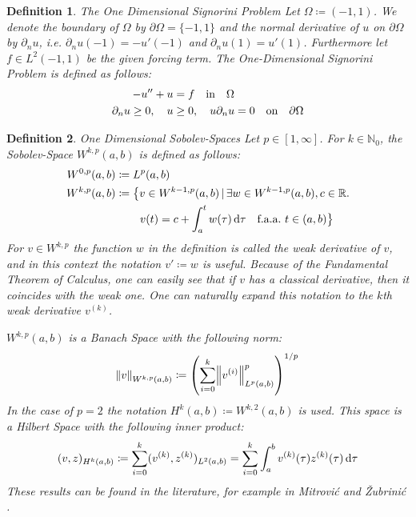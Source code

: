 \documentclass[headsepline,footsepline,footinclude=false,oneside,fontsize=11pt,paper=a4,listof=totoc,bibliography=totoc]{scrbook} %
\newtheorem{definition}{Definition}
\begin{document}
\begin{definition}The One Dimensional Signorini Problem \newline
	Let $\Omega \coloneqq (-1,1)$. We denote the boundary of $\Omega$ by $\partial\Omega = \{-1,1\}$ and the normal derivative of $u$ on $\partial\Omega$ by $\partial_nu$, i.e. $\partial_nu(-1) = -u'(-1)$ and $\partial_nu(1) = u'(1)$. Furthermore let $f \in L^2(-1,1)$ be the given forcing term. The One-Dimensional Signorini Problem is defined as follows:
	\begin{align}
	-u'' + u &= f \quad \textnormal{in} \quad \Omega \label{eq:signorini}\\ 
	\partial_n u \geq 0,\quad u &\geq 0,\quad u\partial_nu = 0 \quad\textnormal{on}\quad \partial \Omega \label{eq:boundary_signorini}
	\end{align}
\end{definition}

\begin{definition}One Dimensional Sobolev-Spaces \newline
	Let $p\in [1,\infty]$. For $k \in \mathbb{N}_0$, the Sobolev-Space $W^{k,p}(a,b)$ is defined as follows:
	\begin{align}
	\begin{split}
	W^{0,p}(a,b) &\coloneqq L^p(a,b) \\
	W^{k,p}(a,b) &\coloneqq \big\{ v \in W^{k-1,p}(a,b) \,|\, \exists w \in W^{k-1,p}(a,b), c\in\mathbb{R}. \\
	& \phantom{\coloneqq \big\{\,\,} v(t) =  c + \int_a^t w(\tau) \dif \tau \quad \text{f.a.a.} \,\, t\in (a,b)  \big\}
	\end{split}
	\end{align}
	For $v\in W^{k,p}$ the function $w$ in the definition is called the weak derivative of $v$, and in this context the notation $v' \coloneqq w$ is useful. Because of the Fundamental Theorem of Calculus, one can easily see that if $v$ has a classical derivative, then it coincides with the weak one. One can naturally expand this notation to the $k$th weak derivative $v^{(k)}$.
	
	$W^{k,p}(a,b)$ is a Banach Space with the following norm:
	\begin{equation}
	\norm{v}_{W^{k,p}(a,b)} \coloneqq \left(\sum\limits_{i = 0}^k \norm{v^{(i)}}_{L^p(a,b)}^p\right)^{1/p} \label{eq:sobolev1_norm}
	\end{equation}
	In the case of $p=2$ the notation $H^k(a,b) \coloneqq W^{k,2}(a,b)$ is used. This space is a Hilbert Space with the following inner product:
	\begin{equation}
	(v,z)_{H^k(a,b)} \coloneqq \sum_{i=0}^{k} (v^{(k)}, z^{(k)})_{L^2(a,b)} = \sum_{i=0}^{k} \int_a^b v^{(k)}(\tau)z^{(k)}(\tau) \dif \tau \label{eq:sobolev1_inner_product}
	\end{equation}
	These results can be found in the literature, for example in Mitrović and Žubrinić \cite[Chapter 5, Section 2, Remark 2]{mitrovic1997fundamentals}.
\end{definition}
\end{document}
